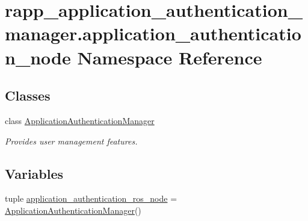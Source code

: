 \hypertarget{namespacerapp__application__authentication__manager_1_1application__authentication__node}{\section{rapp\-\_\-application\-\_\-authentication\-\_\-manager.\-application\-\_\-authentication\-\_\-node Namespace Reference}
\label{namespacerapp__application__authentication__manager_1_1application__authentication__node}
}
\subsection*{Classes}
\begin{DoxyCompactItemize}
\item 
class \hyperlink{classrapp__application__authentication__manager_1_1application__authentication__node_1_1ApplicationAuthenticationManager}{Application\-Authentication\-Manager}
\begin{DoxyCompactList}\small\item\em Provides user management features. \end{DoxyCompactList}\end{DoxyCompactItemize}
\subsection*{Variables}
\begin{DoxyCompactItemize}
\item 
tuple \hyperlink{namespacerapp__application__authentication__manager_1_1application__authentication__node_a3453488fb80c78931a845180b0dad02c}{application\-\_\-authentication\-\_\-ros\-\_\-node} = \hyperlink{classrapp__application__authentication__manager_1_1application__authentication__node_1_1ApplicationAuthenticationManager}{Application\-Authentication\-Manager}()
\end{DoxyCompactItemize}


